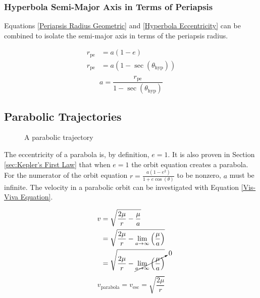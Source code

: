 \documentclass{article}
\begin{document}
\subsubsection{Hyperbola Semi-Major Axis in Terms of Periapsis}

Equations \eqref{Periapsis Radius Geometric} and \eqref{Hyperbola Eccentricity} can be combined to isolate the semi-major axis in terms of the periapsis radius.

\begin{align*}
    r_\text{pe} & =a(1-e)                       \\
    r_\text{pe} & =a(1-\sec(\theta_\text{hyp})) \\
\end{align*}
\begin{equation}\label{Hyperbola SMA}
    a=\frac{{r_\text{pe}}}{1-\sec(\theta_\text{hyp})}
\end{equation}

\bigskip\bigskip
\subsection{Parabolic Trajectories}\label{sec:Analysis of parabolic trajectories}

\begin{figure}[H]
    \centering
    \caption{A parabolic trajectory}\label{fig:Parabolic Trajectory}
\end{figure}

The eccentricity of a parabola is, by definition, $e=1$. It is also proven in Section \ref{sec:Kepler's First Law} that when $e=1$ the orbit equation creates a parabola. For the numerator of the orbit equation $r=\frac{a(1-e^2)}{1+e\cos(\theta)}$ to be nonzero, $a$ must be infinite. The velocity in a parabolic orbit can be investigated with Equation \eqref{Vis-Viva Equation}.

\begin{align*}
    v & =\sqrt{\frac{2\mu}{r}-\frac{\mu}{a}}                                                     \\
      & =\sqrt{\frac{2\mu}{r}-\lim_{a\rightarrow\infty}\left(\frac{\mu}{a}\right)}               \\
      & =\sqrt{\frac{2\mu}{r}-\cancelto{0}{\lim_{a\rightarrow\infty}\left(\frac{\mu}{a}\right)}} \\
\end{align*}
\begin{equation}
    v_\text{parabola}=v_\text{esc}=\sqrt{\frac{2\mu}{r}}
\end{equation}
\end{document}

